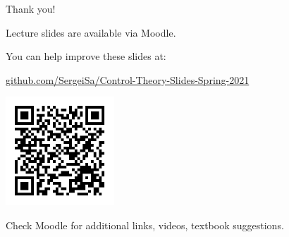 \documentclass{beamer}
\begin{document}












\begin{frame}{Thank you!}
\centerline{Lecture slides are available via Moodle.}
\bigskip
\centerline{You can help improve these slides at:}
\centerline{\href{https://github.com/SergeiSa/Control-Theory-Slides-Spring-2021}{github.com/SergeiSa/Control-Theory-Slides-Spring-2021}}

\includegraphics[width=1.6in]{qrcode.png}\centerline{Check Moodle for additional links, videos, textbook suggestions.}

\end{frame}
\end{document}
